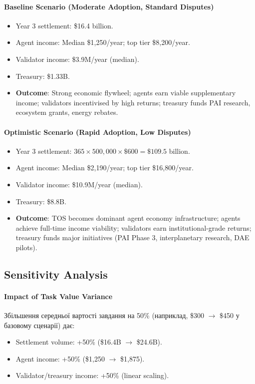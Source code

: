 \documentclass[11pt]{article}
\begin{document}
\paragraph{Baseline Scenario (Moderate Adoption, Standard Disputes)}
\begin{itemize}[noitemsep]
  \item Year 3 settlement: \$16.4 billion.
  \item Agent income: Median \$1{,}250/year; top tier \$8{,}200/year.
  \item Validator income: \$3.9M/year (median).
  \item Treasury: \$1.33B.
  \item \textbf{Outcome}: Strong economic flywheel; agents earn viable supplementary income; validators incentivised by high returns; treasury funds PAI research, ecosystem grants, energy rebates.
\end{itemize}

\paragraph{Optimistic Scenario (Rapid Adoption, Low Disputes)}
\begin{itemize}[noitemsep]
  \item Year 3 settlement: $365 \times 500{,}000 \times \$600 = \$109.5$ billion.
  \item Agent income: Median \$2{,}190/year; top tier \$16{,}800/year.
  \item Validator income: \$10.9M/year (median).
  \item Treasury: \$8.8B.
  \item \textbf{Outcome}: TOS becomes dominant agent economy infrastructure; agents achieve full-time income viability; validators earn institutional-grade returns; treasury funds major initiatives (PAI Phase 3, interplanetary research, DAE pilots).
\end{itemize}

\subsection{Sensitivity Analysis}
\paragraph{Impact of Task Value Variance}
Збільшення середньої вартості завдання на 50\% (наприклад, \$300 $\to$ \$450 у базовому сценарії) дає:
\begin{itemize}[noitemsep]
  \item Settlement volume: +50\% (\$16.4B $\to$ \$24.6B).
  \item Agent income: +50\% (\$1{,}250 $\to$ \$1{,}875).
  \item Validator/treasury income: +50\% (linear scaling).
\end{itemize}
\end{document}

